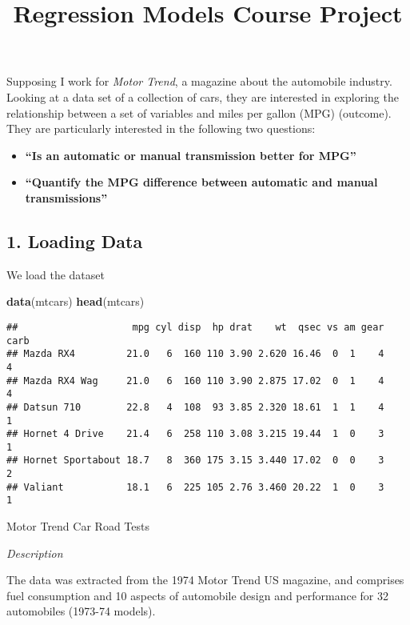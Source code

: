 \documentclass[]{article}
\title{Regression Models Course Project}
\author{}
\date{\vspace{-2.5em}}
\newenvironment{Shaded}{\begin{snugshade}}{\end{snugshade}}
\newcommand{\KeywordTok}[1]{\textcolor[rgb]{0.13,0.29,0.53}{\textbf{#1}}}
\newcommand{\NormalTok}[1]{#1}
\providecommand{\tightlist}{%
  \setlength{\itemsep}{0pt}\setlength{\parskip}{0pt}}
\begin{document}
\maketitle

Supposing I work for \emph{Motor Trend}, a magazine about the automobile
industry. Looking at a data set of a collection of cars, they are
interested in exploring the relationship between a set of variables and
miles per gallon (MPG) (outcome). They are particularly interested in
the following two questions:

\begin{itemize}
\tightlist
\item
  \textbf{``Is an automatic or manual transmission better for MPG''}
\item
  \textbf{``Quantify the MPG difference between automatic and manual
  transmissions''}
\end{itemize}

\subsection{\texorpdfstring{\textbf{1. Loading
Data}}{1. Loading Data}}\label{loading-data}

We load the dataset

\begin{Shaded}
\begin{Highlighting}[]
\KeywordTok{data}\NormalTok{(mtcars)}
\KeywordTok{head}\NormalTok{(mtcars)}
\end{Highlighting}
\end{Shaded}

\begin{verbatim}
##                    mpg cyl disp  hp drat    wt  qsec vs am gear carb
## Mazda RX4         21.0   6  160 110 3.90 2.620 16.46  0  1    4    4
## Mazda RX4 Wag     21.0   6  160 110 3.90 2.875 17.02  0  1    4    4
## Datsun 710        22.8   4  108  93 3.85 2.320 18.61  1  1    4    1
## Hornet 4 Drive    21.4   6  258 110 3.08 3.215 19.44  1  0    3    1
## Hornet Sportabout 18.7   8  360 175 3.15 3.440 17.02  0  0    3    2
## Valiant           18.1   6  225 105 2.76 3.460 20.22  1  0    3    1
\end{verbatim}

Motor Trend Car Road Tests

\emph{Description}

The data was extracted from the 1974 Motor Trend US magazine, and
comprises fuel consumption and 10 aspects of automobile design and
performance for 32 automobiles (1973-74 models).
\end{document}
